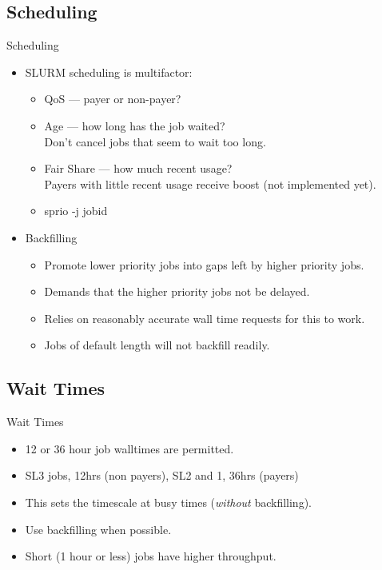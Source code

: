 \subsection{Scheduling}
\begin{frame}{Scheduling}
\begin{itemize}
\item{SLURM scheduling is multifactor:}
  \pause
\begin{itemize}
\item{\alert{QoS} --- payer or non-payer?}
  \pause
\item{\alert{Age} --- how long has the job waited?\hfill\\\qquad
  \alert{Don't cancel jobs that seem to wait too long.}}
  \pause
\item{\alert{Fair Share} --- how much recent usage?\hfill\\\qquad
  \alert{Payers with little recent usage receive boost (not implemented yet).}}
  \pause
\item{\alert{sprio -j jobid}}
\end{itemize}
\pause
\item{\alert{Backfilling}}
\begin{itemize}
  \item{Promote lower priority jobs into gaps left by higher priority jobs.}
    \item{Demands that the higher priority jobs not be delayed.}
    \item{Relies on reasonably accurate wall time requests for this to work.}
      \item{Jobs of default length will not backfill readily.}
\end{itemize}
\end{itemize}
\end{frame}

\subsection{Wait Times}
\begin{frame}{Wait Times}
  \begin{itemize}
 \item{12 or 36 hour job walltimes are permitted.}
    \pause
    \item {SL3 jobs, 12hrs (non payers), SL2 and 1, 36hrs (payers)}
  \item{\alert{This sets the timescale at busy times (\emph{without} backfilling).}}
    \pause
  \item{Use backfilling when possible.}
  \item{Short (1 hour or less) jobs have higher throughput.}
\end{itemize}
\end{frame}

